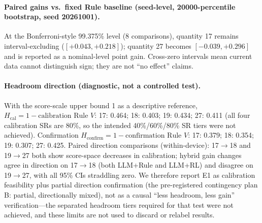 \documentclass[sigconf,anonymous]{aamas}
\begin{document}
\paragraph{Paired gains vs.\ fixed Rule baseline (seed-level, 20000-percentile bootstrap, seed 20261001).}
\begin{center}
\end{center}

At the Bonferroni-style 99.375\% level (8 comparisons), quantity 17 remains interval-excluding ($[+0.043, +0.218]$); quantity 27 becomes $[-0.039, +0.296]$ and is reported as a nominal-level point gain. Cross-zero intervals mean current data cannot distinguish sign; they are not ``no effect'' claims.

\paragraph{Headroom direction (diagnostic, not a controlled test).}
With the score-scale upper bound 1 as a descriptive reference, $H_{\mathrm{cal}} = 1 - \text{calibration Rule } V$: 17: 0.464; 18: 0.403; 19: 0.434; 27: 0.411 (all four calibration SRs are 80\%, so the intended 40\%/60\%/80\% SR tiers were not achieved). Confirmation $H_{\mathrm{confirm}} = 1 - \text{confirmation Rule } V$: 17: 0.379; 18: 0.354; 19: 0.307; 27: 0.425. Paired direction comparisons (within-device): 17$\rightarrow$18 and 19$\rightarrow$27 both show score-space decreases in calibration; hybrid gain changes agree in direction on 17$\rightarrow$18 (both LLM+Rule and LLM+RL) and disagree on 19$\rightarrow$27, with all 95\% CIs straddling zero. We therefore report E1 as calibration feasibility plus partial direction confirmation (the pre-registered contingency plan B: partial, directionally mixed), not as a causal ``less headroom, less gain'' verification---the separated headroom tiers required for that test were not achieved, and these limits are not used to discard or relabel results.
\end{document}
